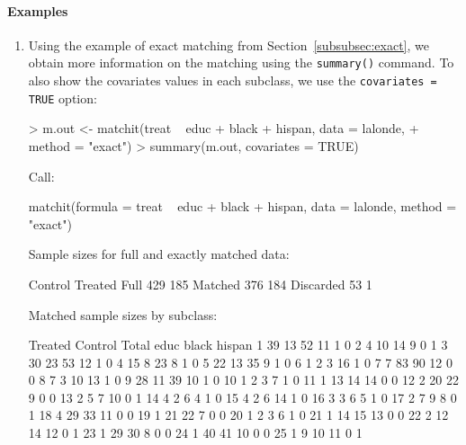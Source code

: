 \documentclass[oneside,letterpaper,titlepage]{article}
\begin{document}
\paragraph{Examples}
\begin{enumerate}
\item Using the example of exact matching from
  Section~\ref{subsubsec:exact}, we obtain more information on the
  matching using the {\tt summary()} command.  To also show the
  covariates values in each subclass, we use the \texttt{covariates =
    TRUE} option:
\begin{Schunk}
\begin{Sinput}
> m.out <- matchit(treat ~ educ + black + hispan, data = lalonde, 
+     method = "exact")
> summary(m.out, covariates = TRUE)
\end{Sinput}
\begin{Soutput}
Call:

matchit(formula = treat ~ educ + black + hispan, data = lalonde, 
    method = "exact")




Sample sizes for full and exactly matched data:

          Control Treated
Full          429     185
Matched       376     184
Discarded      53       1

Matched sample sizes by subclass:

   Treated Control Total educ black hispan
1       39      13    52   11     1      0
2        4      10    14    9     0      1
3       30      23    53   12     1      0
4       15       8    23    8     1      0
5       22      13    35    9     1      0
6        1       2     3   16     1      0
7        7      83    90   12     0      0
8        7       3    10   13     1      0
9       28      11    39   10     1      0
10       1       2     3    7     1      0
11       1      13    14   14     0      0
12       2      20    22    9     0      0
13       2       5     7   10     0      1
14       4       2     6    4     1      0
15       4       2     6   14     1      0
16       3       3     6    5     1      0
17       2       7     9    8     0      1
18       4      29    33   11     0      0
19       1      21    22    7     0      0
20       1       2     3    6     1      0
21       1      14    15   13     0      0
22       2      12    14   12     0      1
23       1      29    30    8     0      0
24       1      40    41   10     0      0
25       1       9    10   11     0      1
\end{Soutput}
\end{Schunk}


\end{enumerate}
\end{document}
